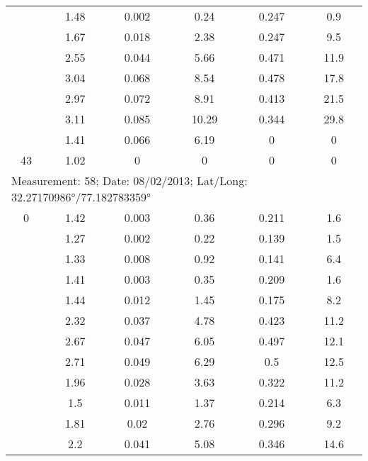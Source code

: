 \begin{longtable}{cccccc}
		& 1.48  & 0.002 & 0.24  & 0.247 & 0.9 \\
		
		& 1.67  & 0.018 & 2.38  & 0.247 & 9.5 \\
		
		& 2.55  & 0.044 & 5.66  & 0.471 & 11.9 \\
		
		& 3.04  & 0.068 & 8.54  & 0.478 & 17.8 \\
		
		& 2.97  & 0.072 & 8.91  & 0.413 & 21.5 \\
		
		& 3.11  & 0.085 & 10.29 & 0.344 & 29.8 \\
		
		& 1.41  & 0.066 & 6.19  & 0     & 0 \\
		
		43    & 1.02  & 0     & 0     & 0     & 0 \\
		\midrule
		\multicolumn{6}{l}{Measurement: 58; Date: 08/02/2013;
			Lat/Long: 32.27170986°/77.182783359°} \\		
		\midrule
		0     & 1.42  & 0.003 & 0.36  & 0.211 & 1.6 \\
		
		& 1.27  & 0.002 & 0.22  & 0.139 & 1.5 \\
		
		& 1.33  & 0.008 & 0.92  & 0.141 & 6.4 \\
		
		& 1.41  & 0.003 & 0.35  & 0.209 & 1.6 \\
		
		& 1.44  & 0.012 & 1.45  & 0.175 & 8.2 \\
		
		& 2.32  & 0.037 & 4.78  & 0.423 & 11.2 \\
		
		& 2.67  & 0.047 & 6.05  & 0.497 & 12.1 \\
		
		& 2.71  & 0.049 & 6.29  & 0.5   & 12.5 \\
		
		& 1.96  & 0.028 & 3.63  & 0.322 & 11.2 \\
		
		& 1.5   & 0.011 & 1.37  & 0.214 & 6.3 \\
		
		& 1.81  & 0.02  & 2.76  & 0.296 & 9.2 \\
		
		& 2.2   & 0.041 & 5.08  & 0.346 & 14.6 \\
		

\end{longtable}
